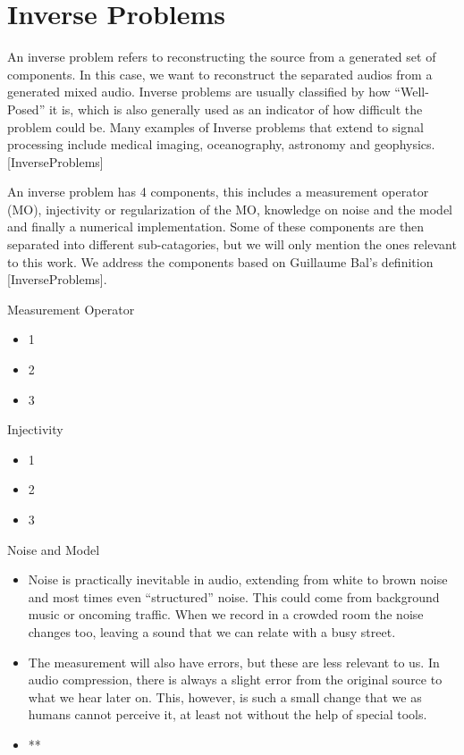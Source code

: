 \documentclass{book}
\begin{document}
\section{Inverse Problems}
\qquad An inverse problem refers to reconstructing the source from a generated set of components.
In this case, we want to reconstruct the separated audios from a generated mixed audio.
Inverse problems are usually classified by how “Well-Posed” it is, which is also generally used as an indicator of how difficult the problem could be.
Many examples of Inverse problems that extend to signal processing include medical imaging, oceanography, astronomy and geophysics. [InverseProblems]
\par
An inverse problem has 4 components, this includes a measurement operator (MO), injectivity or regularization of the MO, knowledge on noise and the model and finally a numerical implementation.
Some of these components are then separated into different sub-catagories, but we will only mention the ones relevant to this work.
We address the components based on Guillaume Bal’s definition [InverseProblems].

\begin{center}
\noindent Measurement Operator
\end{center}
\begin{itemize}
    \item 1
    \item 2
    \item 3
\end{itemize}

\begin{center}
\noindent Injectivity
\end{center}
\begin{itemize}
    \item 1
    \item 2
    \item 3
\end{itemize}

\begin{center}
    \noindent Noise and Model
\end{center}
\begin{itemize}
    \item Noise is practically inevitable in audio, extending from white to brown noise and most times even “structured” noise.
    This could come from background music or oncoming traffic.
    When we record in a crowded room the noise changes too, leaving a sound that we can relate with a busy street.

    \item The measurement will also have errors, but these are less relevant to us.
    In audio compression, there is always a slight error from the original source to what we hear later on.
    This, however, is such a small change that we as humans cannot perceive it, at least not without the help of special tools.

    \item **
\end{itemize}
    
\end{document}
